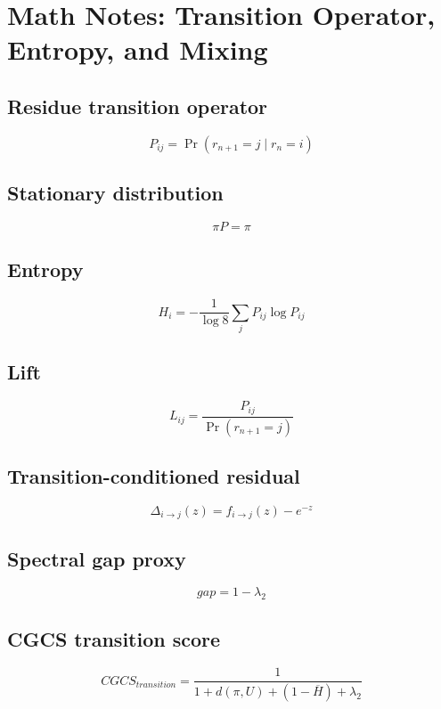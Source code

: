 \documentclass{article}
\begin{document}
\section*{Math Notes: Transition Operator, Entropy, and Mixing}

\subsection*{Residue transition operator}

\[
P_{ij}=\Pr(r_{n+1}=j\mid r_n=i)
\]

\subsection*{Stationary distribution}

\[
\pi P = \pi
\]

\subsection*{Entropy}

\[
H_i = -\frac{1}{\log 8}\sum_j P_{ij}\log P_{ij}
\]

\subsection*{Lift}

\[
L_{ij} = \frac{P_{ij}}{\Pr(r_{n+1}=j)}
\]

\subsection*{Transition-conditioned residual}

\[
\Delta_{i\to j}(z)=f_{i\to j}(z)-e^{-z}
\]

\subsection*{Spectral gap proxy}

\[
gap = 1-\lambda_2
\]

\subsection*{CGCS transition score}

\[
CGCS_{transition} =
\frac{1}{1+d(\pi,U)+(1-\overline{H})+\lambda_2}
\]
\end{document}
